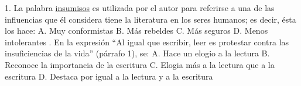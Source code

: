 \documentclass[a4paper,12pt]{article}
\begin{document}
  1. La palabra \underline{ insumisos} es utilizada por el autor para referirse a una de las influencias que él considera tiene la literatura en los seres humanos; es decir, ésta los hace:\newline \newline  
 A. Muy conformistas\newline 
 B. Más rebeldes\newline 
 C. Más seguros\newline 
 D. Menos intolerantes\newline 
 . En la expresión “Al igual que escribir, leer es protestar contra las insuficiencias de la vida” (párrafo 1), se:\newline \newline  
 A. Hace un elogio a la lectura\newline 
 B. Reconoce la importancia de la escritura\newline 
 C. Elogia más a la lectura que a la escritura\newline 
 D. Destaca por igual a la lectura y a la escritura \newline 
 \newline 
\end{document}
